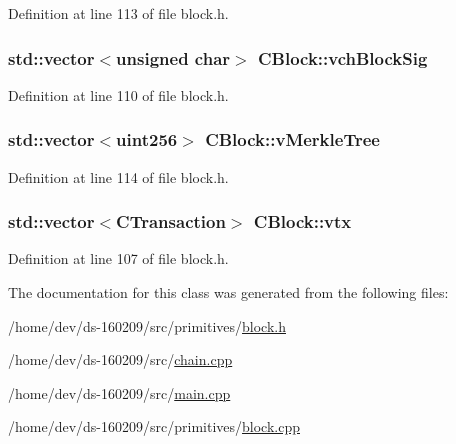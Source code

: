 Definition at line 113 of file block.\+h.

\hypertarget{class_c_block_a78f882e24c4416f42039cbc6a67faf6e}{}
\subsubsection[{vch\+Block\+Sig}]{\setlength{\rightskip}{0pt plus 5cm}std\+::vector$<$unsigned char$>$ C\+Block\+::vch\+Block\+Sig}\label{class_c_block_a78f882e24c4416f42039cbc6a67faf6e}


Definition at line 110 of file block.\+h.

\hypertarget{class_c_block_a019ae6579acd08974653d3f443dd398a}{}
\subsubsection[{v\+Merkle\+Tree}]{\setlength{\rightskip}{0pt plus 5cm}std\+::vector$<${\bf uint256}$>$ C\+Block\+::v\+Merkle\+Tree\hspace{0.3cm}{\ttfamily [mutable]}}\label{class_c_block_a019ae6579acd08974653d3f443dd398a}


Definition at line 114 of file block.\+h.

\hypertarget{class_c_block_a9b6508d662722775f3029b980b382b66}{}
\subsubsection[{vtx}]{\setlength{\rightskip}{0pt plus 5cm}std\+::vector$<${\bf C\+Transaction}$>$ C\+Block\+::vtx}\label{class_c_block_a9b6508d662722775f3029b980b382b66}


Definition at line 107 of file block.\+h.



The documentation for this class was generated from the following files\+:\begin{DoxyCompactItemize}
\item 
/home/dev/ds-\/160209/src/primitives/\hyperlink{primitives_2block_8h}{block.\+h}\item 
/home/dev/ds-\/160209/src/\hyperlink{chain_8cpp}{chain.\+cpp}\item 
/home/dev/ds-\/160209/src/\hyperlink{main_8cpp}{main.\+cpp}\item 
/home/dev/ds-\/160209/src/primitives/\hyperlink{block_8cpp}{block.\+cpp}\end{DoxyCompactItemize}
